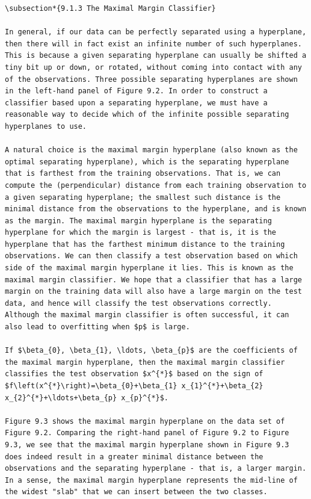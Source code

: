 \documentclass[10pt]{article}
\begin{document}
\begin{verbatim}
\subsection*{9.1.3 The Maximal Margin Classifier}

In general, if our data can be perfectly separated using a hyperplane, then there will in fact exist an infinite number of such hyperplanes. This is because a given separating hyperplane can usually be shifted a tiny bit up or down, or rotated, without coming into contact with any of the observations. Three possible separating hyperplanes are shown in the left-hand panel of Figure 9.2. In order to construct a classifier based upon a separating hyperplane, we must have a reasonable way to decide which of the infinite possible separating hyperplanes to use.

A natural choice is the maximal margin hyperplane (also known as the optimal separating hyperplane), which is the separating hyperplane that is farthest from the training observations. That is, we can compute the (perpendicular) distance from each training observation to a given separating hyperplane; the smallest such distance is the minimal distance from the observations to the hyperplane, and is known as the margin. The maximal margin hyperplane is the separating hyperplane for which the margin is largest - that is, it is the hyperplane that has the farthest minimum distance to the training observations. We can then classify a test observation based on which side of the maximal margin hyperplane it lies. This is known as the maximal margin classifier. We hope that a classifier that has a large margin on the training data will also have a large margin on the test data, and hence will classify the test observations correctly. Although the maximal margin classifier is often successful, it can also lead to overfitting when $p$ is large.

If $\beta_{0}, \beta_{1}, \ldots, \beta_{p}$ are the coefficients of the maximal margin hyperplane, then the maximal margin classifier classifies the test observation $x^{*}$ based on the sign of $f\left(x^{*}\right)=\beta_{0}+\beta_{1} x_{1}^{*}+\beta_{2} x_{2}^{*}+\ldots+\beta_{p} x_{p}^{*}$.

Figure 9.3 shows the maximal margin hyperplane on the data set of Figure 9.2. Comparing the right-hand panel of Figure 9.2 to Figure 9.3, we see that the maximal margin hyperplane shown in Figure 9.3 does indeed result in a greater minimal distance between the observations and the separating hyperplane - that is, a larger margin. In a sense, the maximal margin hyperplane represents the mid-line of the widest "slab" that we can insert between the two classes.


\end{verbatim}
\end{document}
